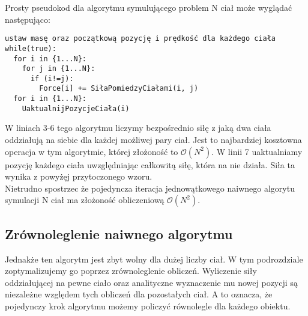 \documentclass[14pt,twoside,a4paper]{article}
\theoremstyle{definition}
\begin{document}
Prosty pseudokod dla algorytmu symulującego problem N ciał może wyglądać następująco:\\
\bigskip
{}
\begin{lstlisting}[frame=single, framerule=2pt, caption=Pseudokod naiwnego algorytmu]
ustaw masę oraz początkową pozycję i prędkość dla każdego ciała
while(true):
  for i in {1...N}:
    for j in {1...N}:
      if (i!=j):
        Force[i] += SiłaPomiedzyCiałami(i, j) 
  for i in {1...N}:
    UaktualnijPozycjeCiała(i)
\end{lstlisting}

\bigskip

W liniach 3-6 tego algorytmu liczymy bezpośrednio siłę z jaką dwa ciała oddziałują na siebie dla każdej możliwej pary ciał. Jest to najbardziej kosztowna operacja w tym algorytmie, której złożoność to $\mathcal{O}(N^{2})$. W linii 7 uaktualniamy pozycję każdego ciała uwzględniając całkowitą siłę, która na nie działa. Siła ta wynika z powyżęj przytoczonego wzoru. \\

Nietrudno spostrzec że pojedyncza iteracja jednowątkowego naiwnego algorytu symulacji N ciał ma złożoność obliczeniową $\mathcal{O}(N^{2})$.


\subsection{\Large Zrównoleglenie naiwnego algorytmu}

Jednakże ten algorytm jest zbyt wolny dla dużej liczby ciał. W tym podrozdziale zoptymalizujemy go poprzez zrównoleglenie obliczeń. Wyliczenie siły oddziałującej na pewne ciało oraz analityczne wyznaczenie mu nowej pozycji są niezależne względem tych obliczeń dla pozostałych ciał. A to oznacza, że pojedynczy krok algorytmu możemy policzyć równolegle dla każdego obiektu.
\end{document}
